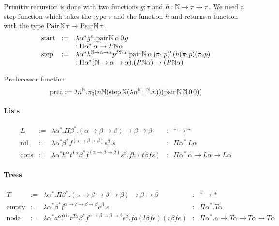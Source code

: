 Primitiv recursion is done with two functions $g:\tau$ and
$h:\mathbb{N} \to \tau \to \tau$. We need a step function which takes the type
$\tau$ and the function $h$ and returns a function with the type
$\text{Pair}\,\mathbb{N}\,\tau \to \text{Pair}\,\mathbb{N}\,\tau$.
$$
\begin{array}{lll}
  \text{start}
  &:=& \lambda
       \alpha^*
       g^\alpha
       . \text{pair}\,\mathbb{N}\,\alpha\,0\,g
  \\
  & &: \Pi \alpha^*. \alpha \to P\mathbb{N}\alpha
  \\
  \text{step}
  &:=& \lambda
       \alpha^*
       h^{\mathbb{N}\to\alpha\to\alpha}
       p^{P\mathbb{N}\alpha}
       . \text{pair}\,\mathbb{N}\,\alpha\,
       (\pi_1\,p)'\,
       (h (\pi_1 p) (\pi_2 p)
  \\
  & &: \Pi \alpha^* (\mathbb{N}\to\alpha\to\alpha)
      . (P\mathbb{N}\alpha)\to (P\mathbb{N}\alpha)
\end{array}
$$


Predecessor function
$$
\text{pred} :=
\lambda n^{\mathbb{N}}.
\pi_2 (
  n
  \mathbb{N} (\text{step}\,\mathbb{N} (\lambda n^{\mathbb{N}} \_^{\mathbb{N}}. n))
  (\text{pair}\,\mathbb{N}\,\mathbb{N}\,0\,0)
)
$$



\paragraph{Lists}

$$
\begin{array}{lllll}
  L
  &:=& \lambda \alpha^* .
       \Pi \beta^* . (\alpha\to\beta\to\beta) \to \beta \to \beta
  &:& * \to *
  \\
  \text{nil}
  &:=& \lambda \alpha^* \beta^* f^{(\alpha\to\beta\to\beta)} s^\beta . s
  &:& \Pi \alpha^* . L \alpha
  \\
  \text{cons}
  &:=& \lambda
       \alpha^*
       h^\alpha
       t^{L\alpha}
       \beta^*
       f^{(\alpha\to\beta\to\beta)}
       s^\beta
       . f h (t \beta f s)
  &:& \Pi \alpha^* . \alpha \to L \alpha \to L \alpha
\end{array}
$$




\paragraph{Trees}

$$
\begin{array}{lllll}
  T
  &:=& \lambda \alpha^* .
       \Pi \beta^* . (\alpha\to\beta\to\beta\to\beta) \to \beta \to \beta
  &:& * \to *
  \\
  \text{empty}
  &:=& \lambda \alpha^* \beta^* f^{\alpha\to\beta\to\beta\to\beta} e^\beta . e
  &:& \Pi \alpha^* . T \alpha
  \\
  \text{node}
  &:=& \lambda
       \alpha^*
       a^\alpha
       l^{T\alpha}
       r^{T\alpha}
       \beta^*
       f^{\alpha\to\beta\to\beta\to\beta}
       e^\beta
       . f a (l \beta f e) (r \beta f e)
  &:& \Pi \alpha^* . \alpha \to T \alpha \to T \alpha \to T \alpha
\end{array}
$$

